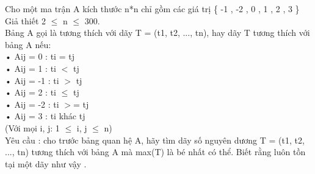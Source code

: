 Cho một ma trận A kích thước n*n chỉ gồm các giá trị \{ -1 , -2 , 0 , 1 , 2 , 3 \}   
\\   Giả thiết 2  $\le$  n  $\le$  300.   
\\   Bảng A gọi là tương thích với dãy T = (t1, t2, ..., tn), hay dãy T tương thích với bảng A nếu:   
\\   • Aij = 0  :   ti = tj   
\\   • Aij = 1  :   ti $<$ tj   
\\   • Aij = -1 :   ti $>$ tj   
\\   • Aij = 2  :  ti  $\le$  tj   
\\   • Aij = -2 :   ti $>$= tj   
\\   • Aij = 3  :   ti khác tj   
\\   (Với mọi i, j: 1  $\le$  i, j  $\le$  n)   
\\   Yêu cầu : cho trước bảng quan hệ A, hãy tìm dãy số nguyên dương T = (t1, t2, ..., tn) tương thích với bảng A mà max(T) là bé nhất có thể. Biết rằng luôn tồn tại một dãy như vậy .